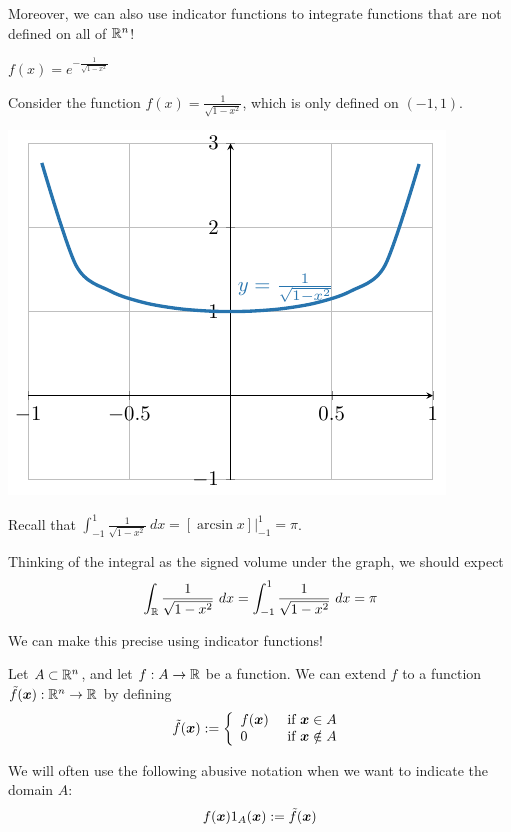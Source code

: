     Moreover, we can also use indicator functions to integrate functions that are not defined on all of $\mathbb{R}^n$!  

    \begin{example}
        $f(x) = e^{-\frac{1}{\sqrt{1-x^2}}}$
    \end{example}

    \begin{example}
        Consider the function $f(x) = \frac{1}{\sqrt{1-x^2}}$, which is only defined on $(-1,1)$.

        \begin{center}
            \includegraphics{chapters/4-IntegrationRn/figures/figures-undefinedonr.pdf}
        \end{center}
        Recall that $\int_{-1}^1 \frac{1}{\sqrt{1-x^2}} \ dx = \left[\arcsin{x}\right] \bigg|_{-1}^1 = \pi$.
    \end{example}

Thinking of the integral as the signed volume under the graph, we should expect $$\int_{\mathbb{R}} \frac{1}{\sqrt{1-x^2}} \ dx = \int_{-1}^1 \frac{1}{\sqrt{1-x^2}} \ dx = \pi$$

    We can make this precise using indicator functions!  

    \begin{definition}
     Let $A \subset \mathbb{R}^n$, and let $f : A \to \mathbb{R}$ be a function. We can extend $f$ to a function $\Tilde{f}(\bm{x}) : \mathbb{R}^n \to \mathbb{R}$ by defining
    $$\Tilde{f}(\bm{x}) := \left\{
		\begin{array}{ll}
			f(\bm{x}) & \text{ if } \bm{x} \in A \\
			0 & \text{ if } \bm{x} \notin A
		\end{array}
		\right.$$
        
    We will often use the following abusive notation when we want to indicate the domain $A$:
    $$f(\bm{x})1_A(\bm{x}) := \Tilde{f}(\bm{x})$$   
    \end{definition}

